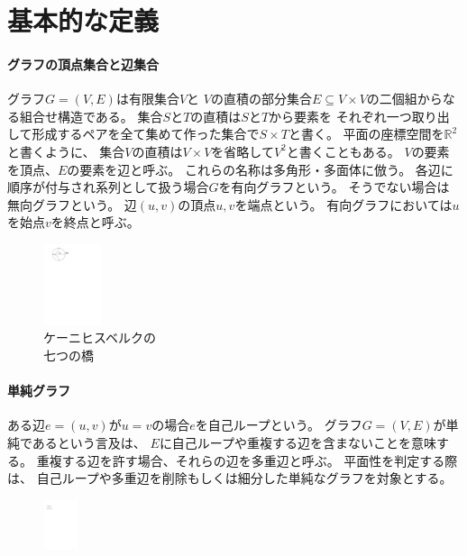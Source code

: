 \section{基本的な定義}

\begin{paracol}{2}
\paragraph{グラフの頂点集合と辺集合}
グラフ$G=(V, E)$は有限集合$V$と
$V$の直積の部分集合$E \subseteq V\times V$の二個組からなる組合せ構造である。
集合$S$と$T$の直積は$S$と$T$から要素を
それぞれ一つ取り出して形成するペアを全て集めて作った集合で$S\times T$と書く。
平面の座標空間を${\mathbb R}^2$と書くように、
集合$V$の直積は$V\times V$を省略して$V^2$と書くこともある。
$V$の要素を頂点、$E$の要素を辺と呼ぶ。
これらの名称は多角形・多面体に倣う。
各辺に順序が付与され系列として扱う場合$G$を有向グラフという。
そうでない場合は無向グラフという。
辺$(u, v)$の頂点$u, v$を端点という。
有向グラフにおいては$u$を始点$v$を終点と呼ぶ。
\switchcolumn
\vspace{-0.5\intextsep}
\begin{figure}[ht]
\centering
\includegraphics[width=0.15\textwidth]{figures/Konigsberg.pdf}\\
{\small ケーニヒスベルクの\\七つの橋}
\end{figure}
\end{paracol}




\begin{paracol}{2}
\paragraph{単純グラフ}
ある辺$e=(u, v)$が$u=v$の場合$e$を自己ループという。
グラフ$G=(V, E)$が単純であるという言及は、
$E$に自己ループや重複する辺を含まないことを意味する。
重複する辺を許す場合、それらの辺を多重辺と呼ぶ。
平面性を判定する際は、
自己ループや多重辺を削除もしくは細分した単純なグラフを対象とする。
\switchcolumn
\begin{figure}[ht]
\centering
\includegraphics[width=0.09\textwidth]{figures/self_loop_and_multiedges.pdf}
\end{figure}
\end{paracol}


